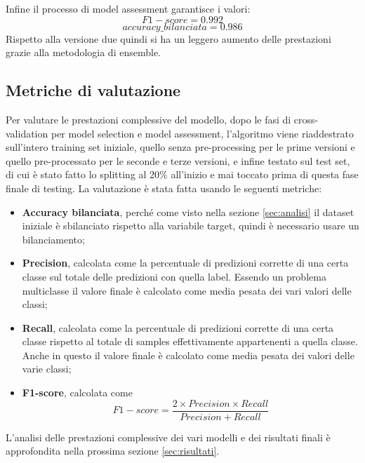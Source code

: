 Infine il processo di model assessment garantisce i valori:
$$F1-score = 0.992$$
$$accuracy\_bilanciata = 0.986$$
Rispetto alla versione due quindi si ha un leggero aumento delle prestazioni grazie alla metodologia di ensemble.

\subsection{Metriche di valutazione}
Per valutare le prestazioni complessive del modello, dopo le fasi di cross-validation per model selection e model assessment, l'algoritmo viene riaddestrato sull'intero training set iniziale, quello senza pre-processing per le prime versioni e quello pre-processato per le seconde e terze versioni, e infine testato sul test set, di cui è stato fatto lo splitting al 20\% all'inizio e mai toccato prima di questa fase finale di testing. La valutazione è stata fatta usando le seguenti metriche:
\begin{itemize}
\item \textbf{Accuracy bilanciata}, perché come visto nella sezione \ref{sec:analisi} il dataset iniziale è sbilanciato rispetto alla variabile target, quindi è necessario usare un bilanciamento;
\item \textbf{Precision}, calcolata come la percentuale di predizioni corrette di una certa classe sul totale delle predizioni con quella label. Essendo un problema multiclasse il valore finale è calcolato come media pesata dei vari valori delle classi;
\item \textbf{Recall}, calcolata come la percentuale di predizioni corrette di una certa classe rispetto al totale di samples effettivamente appartenenti a quella classe. Anche in questo il valore finale è calcolato come media pesata dei valori delle varie classi;
\item \textbf{F1-score}, calcolata come
\begin{equation}
F1-score = \frac{2 \times Precision \times Recall}{Precision+Recall}
\end{equation}
\end{itemize}

L'analisi delle prestazioni complessive dei vari modelli e dei risultati finali è approfondita nella prossima sezione \ref{sec:risultati}.